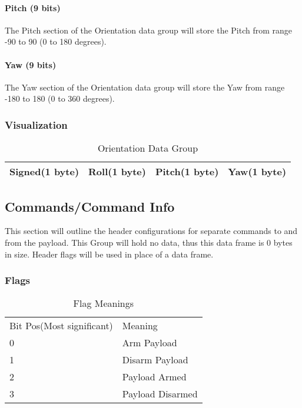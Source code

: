 \documentclass{article}
\begin{document}
  \paragraph{Pitch (9 bits)}
  The Pitch section of the Orientation data group will store the Pitch from range -90 to 90 (0 to 180 degrees).  
  \paragraph{Yaw (9 bits)}
  The Yaw section of the Orientation data group will store the Yaw from range -180 to 180 (0 to 360 degrees).  
  
  \subsubsection{Visualization}
  \begin{table}[H]
  \centering
  \caption{Orientation Data Group}
  \label{Orientation}
  \begin{tabular}{|l|l|l|l|}
  \hline
  
Signed(1 byte) & Roll(1 byte) & Pitch(1 byte) & Yaw(1 byte) \\ \hline

  \end{tabular}
  \end{table}
  
 \pagebreak  
  
  \subsection{Commands/Command Info}
  This section will outline the header configurations for separate commands to and from the payload. This Group will hold no data, thus this data frame is 0 bytes in size. Header flags will be used in place of a data frame.
  \subsubsection{Flags}

  \begin{table}[h]
  \centering
  \caption{Flag Meanings}
  \begin{tabular}{ll}
    Bit Pos(Most significant) & Meaning \\
  0     & Arm Payload \\
  1     & Disarm Payload     \\
  2     & Payload Armed        \\
  3     & Payload Disarmed       \\
  \end{tabular}
  \end{table}
  
\end{document}
